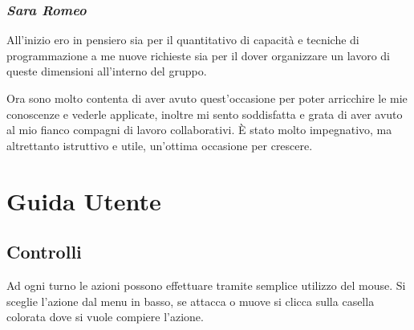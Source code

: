 \documentclass[a4paper,titlepage,12pt]{article}
\begin{document}
\subsubsection*{\large \slshape Sara Romeo}
\par \noindent All'inizio ero in pensiero sia per il quantitativo di capacità e tecniche di programmazione a me nuove richieste sia per il dover organizzare un lavoro di queste dimensioni all'interno del gruppo.
\par \noindent Ora sono molto contenta di aver avuto quest'occasione per poter arricchire le mie conoscenze e vederle applicate, inoltre mi sento soddisfatta e grata di aver avuto al mio fianco compagni di lavoro collaborativi. È stato molto impegnativo, ma altrettanto istruttivo e utile, un'ottima occasione per crescere.

\newpage
\appendix
\section{Guida Utente}

\subsection*{Controlli}
Ad ogni turno le azioni possono effettuare tramite semplice utilizzo del mouse. Si sceglie l'azione dal menu in basso, se attacca o muove si clicca sulla casella colorata dove si vuole compiere l'azione.
\end{document}

